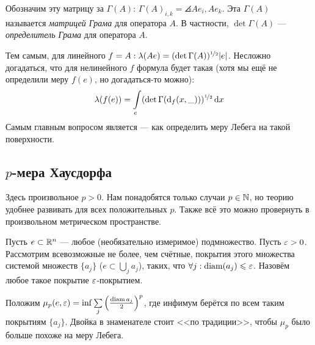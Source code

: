\documentclass[a4paper]{report}
\begin{document}
    Обозначим эту матрицу за $\Gamma(A)$: $\Gamma(A)_{i,k} = \angles{A e_i, A e_k}$.
    Эта $\Gamma(A)$ называется \emph{матрицей Грама} для оператора $A$.
    В частности, $\det\Gamma(A)$ --- \emph{определитель Грама} для оператора $A$.

    Тем самым, для линейного $f = A: \lambda(Ae) = (\det \Gamma(A))^{\nicefrac12}|e|$.
    Несложно догадаться, что для нелинейного $f$ формула будет такая (хотя мы ещё не определили меру $f(e)$, но догадаться-то можно): \[\lambda(f(e)) = \int\limits_{e}(\det \Gamma(\operatorname{d}\!_f(x, \_)))^{\nicefrac12}\operatorname{d}\! x\]
    Самым главным вопросом является --- как определить меру Лебега на такой поверхности.

    \subsection{$p$-мера Хаусдорфа}
    Здесь произвольное $p > 0$.
    Нам понадобятся только случаи $p \in \mathbb{N}$, но теорию удобнее развивать для всех положительных $p$.
    Также всё это можно провернуть в произвольном метрическом пространстве.

    Пусть $e \subset \mathbb{R}^n$ --- любое (необязательно измеримое) подмножество.
    Пусть $\varepsilon > 0$.
    Рассмотрим всевозможные не более, чем счётные, покрытия этого множества системой множеств $\{a_j\}$ ($e \subset \bigcup\limits_{j}a_j$), таких, что $\forall j: \operatorname{diam}(a_j) \leqslant \varepsilon$.
    Назовём любое такое покрытие $\varepsilon$-покрытием.

    Положим $\mu_p(e, \varepsilon) = \inf\sum\limits_{j}\left(\frac{\operatorname{diam} a_j}2\right)^p$, где инфимум берётся по всем таким покрытиям $\{a_j\}$.
    Двойка в знаменателе стоит <<по традиции>>, чтобы $\mu_p$ было больше похоже на меру Лебега.
\end{document}
